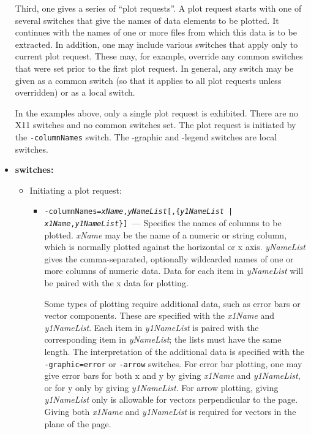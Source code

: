 \begin{itemize}
Third, one gives a series of ``plot requests''.  A plot request starts with one of several switches that give the
names of data elements to be plotted.  It continues with the names of one or more files from which this data is to
be extracted.  In addition, one may include various switches that apply only to current plot request.  These may,
for example, override any common switches that were set prior to the first plot request.  In general, any switch
may be given as a common switch (so that it applies to all plot requests unless overridden) or as a local switch.

In the examples above, only a single plot request is exhibited.  There are no X11 switches and no common switches
set.  The plot request is initiated by the {\tt -columnNames} switch.  The {-graphic} and {-legend} switches are
local switches.

\item {\bf switches:}
\begin{itemize}
\item Initiating a plot request:\\
  \begin{itemize}
  \item {\tt -columnNames={\em xName},{\em yNameList}[,\{{\em y1NameList} | {\em x1Name},{\em y1NameList}\}] }---
        Specifies the names of columns to be plotted.  {\em xName} may be the name of a numeric or string column,
        which is normally plotted against the horizontal or x axis.
        {\em yNameList} gives the comma-separated, optionally wildcarded names of one or more columns of numeric
        data.  Data for each item in {\em yNameList} will be paired with the x data for plotting.

        Some types of plotting require additional data, such as error bars or vector components.  These are
        specified with the {\em x1Name} and {\em y1NameList}.  Each item in {\em y1NameList} is paired with the
        corresponding item in {\em yNameList}; the lists must have the same length.  The interpretation of the
        additional data is specified with the {\tt -graphic=error} or {\tt -arrow} switches. For error bar
        plotting, one may give error bars for both x and y by giving {\em x1Name} and {\em y1NameList}, or for y
        only by giving {\em y1NameList}.  For arrow plotting, giving {\em y1NameList} only is allowable for
        vectors perpendicular to the page. Giving both {\em x1Name} and {\em y1NameList} is required for vectors
        in the plane of the page.


\end{itemize}
\end{itemize}
\end{itemize}
